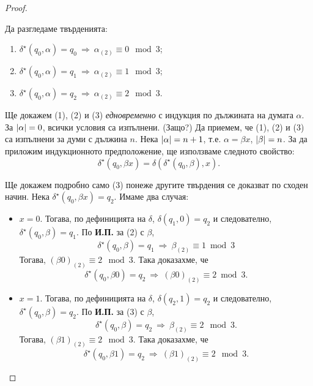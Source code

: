 \begin{proof}
\begin{figure}[H]
\begin{center}
      \end{center}
 \end{figure}
 \noindent Да разгледаме твърденията:
 \begin{enumerate}[(1)]
  \item 
    $\delta^\star(q_0,\alpha) = q_0\ \Rightarrow\ \alpha_{(2)} \equiv 0 \mod 3$;
  \item 
    $\delta^\star(q_0,\alpha) = q_1\ \Rightarrow\ \alpha_{(2)} \equiv 1 \mod 3$;
  \item 
    $\delta^\star(q_0,\alpha) = q_2\ \Rightarrow\ \alpha_{(2)} \equiv 2 \mod 3$.
  \end{enumerate}
  Ще докажем (1), (2) и (3) {\em едновременно} с индукция по дължината на думата $\alpha$.
  За $\lvert{\alpha}\rvert = 0$, всички условия са изпълнени. (Защо?)
  Да приемем, че (1), (2) и (3) са изпълнени за думи с дължина $n$.
  Нека $\lvert{\alpha}\rvert = n+1$, т.е. $\alpha = \beta x$, $\lvert{\beta}\rvert = n$.
  За да приложим индукционното предположение, ще използваме следното свойство:
  \[\delta^\star(q_0,\beta x) = \delta(\delta^\star(q_0,\beta),x).\]
  
  Ще докажем подробно само (3) понеже другите твърдения се доказват по сходен начин.
  Нека $\delta^\star(q_0,\beta x) = q_2$. 
  Имаме два случая:
  \begin{itemize}
  \item 
    $x = 0$. 
    Тогава, по дефиницията на $\delta$, 
    $\delta(q_1,0) = q_2$ и следователно, $\delta^\star(q_0,\beta) = q_1$.
    По {\bf И.П.} за (2) с $\beta$,
    \[\delta^\star(q_0,\beta) = q_1\ \Rightarrow\ \beta_{(2)} \equiv 1 \bmod 3\]
    Тогава, $(\beta0)_{(2)} \equiv 2 \mod 3$. Така доказахме, че
    \[\delta^\star(q_0,\beta 0) = q_2\ \Rightarrow\ (\beta 0)_{(2)} \equiv 2 \bmod 3.\]
  \item
    $x = 1$.
    Тогава, по дефиницията на $\delta$, $\delta(q_2,1) = q_2$ и следователно,
    $\delta^\star(q_0,\beta) = q_2$.
    По {\bf И.П.} за (3) с $\beta$,
    \[\delta^\star(q_0,\beta) = q_2\ \Rightarrow\ \beta_{(2)} \equiv 2 \mod 3.\]
    Тогава, $(\beta1)_{(2)} \equiv 2 \mod 3$. Така доказахме, че
    \[\delta^\star(q_0,\beta 1) = q_2\ \Rightarrow\ (\beta 1)_{(2)} \equiv 2 \mod 3.\]
  \end{itemize}
  

\end{proof}
